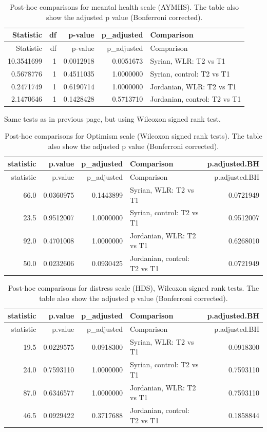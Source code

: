 \documentclass[]{article}
\begin{document}
\begin{longtable}[]{@{}rrrrl@{}}
\caption{Post-hoc comparisons for meantal health scale (AYMHS). The
table also show the adjusted p value (Bonferroni
corrected).}\tabularnewline
\toprule
Statistic & df & p-value & p\_adjusted & Comparison\tabularnewline
\midrule
\endfirsthead
\toprule
Statistic & df & p-value & p\_adjusted & Comparison\tabularnewline
\midrule
\endhead
10.3541699 & 1 & 0.0012918 & 0.0051673 & Syrian, WLR: T2 vs
T1\tabularnewline
0.5678776 & 1 & 0.4511035 & 1.0000000 & Syrian, control: T2 vs
T1\tabularnewline
0.2471749 & 1 & 0.6190714 & 1.0000000 & Jordanian, WLR: T2 vs
T1\tabularnewline
2.1470646 & 1 & 0.1428428 & 0.5713710 & Jordanian, control: T2 vs
T1\tabularnewline
\bottomrule
\end{longtable}

\newpage

Same tests as in previous page, but using Wilcoxon signed rank test.

\begin{longtable}[]{@{}rrrlr@{}}
\caption{Post-hoc comparisons for Optimism scale (Wilcoxon signed rank
tests). The table also show the adjusted p value (Bonferroni
corrected).}\tabularnewline
\toprule
statistic & p.value & p\_adjusted & Comparison &
p.adjusted.BH\tabularnewline
\midrule
\endfirsthead
\toprule
statistic & p.value & p\_adjusted & Comparison &
p.adjusted.BH\tabularnewline
\midrule
\endhead
66.0 & 0.0360975 & 0.1443899 & Syrian, WLR: T2 vs T1 &
0.0721949\tabularnewline
23.5 & 0.9512007 & 1.0000000 & Syrian, control: T2 vs T1 &
0.9512007\tabularnewline
92.0 & 0.4701008 & 1.0000000 & Jordanian, WLR: T2 vs T1 &
0.6268010\tabularnewline
50.0 & 0.0232606 & 0.0930425 & Jordanian, control: T2 vs T1 &
0.0721949\tabularnewline
\bottomrule
\end{longtable}

\begin{longtable}[]{@{}rrrlr@{}}
\caption{Post-hoc comparisons for distress scale (HDS), Wilcoxon signed
rank tests. The table also show the adjusted p value (Bonferroni
corrected).}\tabularnewline
\toprule
statistic & p.value & p\_adjusted & Comparison &
p.adjusted.BH\tabularnewline
\midrule
\endfirsthead
\toprule
statistic & p.value & p\_adjusted & Comparison &
p.adjusted.BH\tabularnewline
\midrule
\endhead
19.5 & 0.0229575 & 0.0918300 & Syrian, WLR: T2 vs T1 &
0.0918300\tabularnewline
24.0 & 0.7593110 & 1.0000000 & Syrian, control: T2 vs T1 &
0.7593110\tabularnewline
87.0 & 0.6346577 & 1.0000000 & Jordanian, WLR: T2 vs T1 &
0.7593110\tabularnewline
46.5 & 0.0929422 & 0.3717688 & Jordanian, control: T2 vs T1 &
0.1858844\tabularnewline
\bottomrule
\end{longtable}
\end{document}
